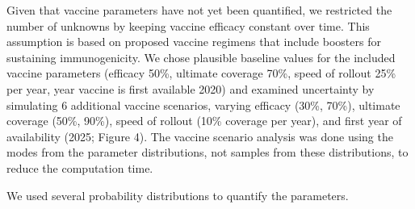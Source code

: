 \documentclass{article}
\begin{document}
Given that vaccine parameters have not yet been quantified, we
restricted the number of unknowns by keeping vaccine efficacy constant
over time.  This assumption is based on proposed vaccine regimens that
include boosters for sustaining immunogenicity.  We chose plausible
baseline values for the included vaccine parameters (efficacy 50\%,
ultimate coverage 70\%, speed of rollout 25\% per year, year vaccine
is first available 2020) and examined uncertainty by simulating 6
additional vaccine scenarios, varying efficacy (30\%, 70\%), ultimate
coverage (50\%, 90\%), speed of rollout (10\% coverage per year), and
first year of availability (2025; Figure 4). The vaccine scenario
analysis was done using the modes from the parameter distributions,
not samples from these distributions, to reduce the computation time.

We used several probability distributions to quantify the parameters.
\end{document}
